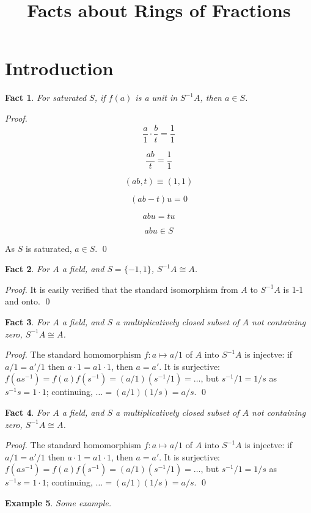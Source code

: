 \documentclass{article}
\title{Facts about Rings of Fractions}
\date{}
\newtheorem{theorem}{Fact}[section]
\newtheorem{example}[theorem]{Example}
\begin{document}
\maketitle

\section{Introduction}

\begin{theorem}
For saturated $S$, if $f(a)$ is a unit in $S^{-1}A$, then $a \in S$.
\end{theorem}

\vspace*{10px} 

\noindent
\textit{Proof.}
\[
  \frac{a}{1} \cdot \frac{b}{t} = \frac{1}{1} 
\]

\[
  \frac{ab}{t} = \frac{1}{1}
\]

\[
   (ab, t) \equiv (1, 1)
\]
 
\[
   (ab - t)u = 0
\]

\[
   abu = tu
\]

\[
   abu \in S
\]

As \( S \) is saturated, \( a \in S \).  \qed

\vspace{2em}

\begin{theorem}
For $A$ a field, and $S = \{-1, 1\}$, $S^{-1}A \cong A$.
\end{theorem}

\noindent
\textit{Proof.} It is easily verified that the standard isomorphism from $A$ to $S^{-1}A$ is 1-1 and onto. \qed

\begin{theorem}
For $A$ a field, and $S$ a multiplicatively closed subset of $A$ not containing zero, $S^{-1}A \cong A$.
\end{theorem}

\noindent
\textit{Proof.} The standard homomorphism $f:a \mapsto a/1$ of $A$ into $S^{-1}A$ is injectve: if $a/1 = a'/1$ then $a \cdot 1 = a1 \cdot 1$, then $a = a'$. It is surjective: $f(as^{-1}) = f(a)f(s^{-1}) = (a/1)(s^{-1}/1) = \ldots$, but $s^{-1}/1 = 1/s$ as $s^{-1}s = 1 \cdot 1$; continuing, $\ldots = (a/1)(1/s) = a/s$. \qed

\begin{theorem}
For $A$ a field, and $S$ a multiplicatively closed subset of $A$ not containing zero, $S^{-1}A \cong A$.
\end{theorem}

\noindent
\textit{Proof.} The standard homomorphism $f:a \mapsto a/1$ of $A$ into $S^{-1}A$ is injectve: if $a/1 = a'/1$ then $a \cdot 1 = a1 \cdot 1$, then $a = a'$. It is surjective: $f(as^{-1}) = f(a)f(s^{-1}) = (a/1)(s^{-1}/1) = \ldots$, but $s^{-1}/1 = 1/s$ as $s^{-1}s = 1 \cdot 1$; continuing, $\ldots = (a/1)(1/s) = a/s$. \qed

\begin{example}
Some example.
\end{example}
\end{document}
